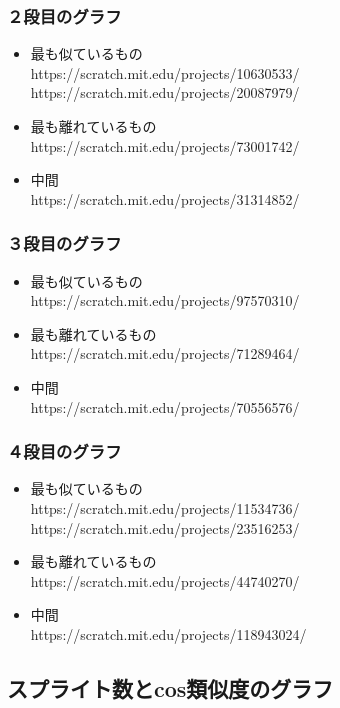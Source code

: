 \documentclass[a4paper,10pt,onecolumn,oneside,openany]{jsbook}
\begin{document}
\subsubsection{２段目のグラフ}
\begin{itemize}
\item 最も似ているもの
\\https://scratch.mit.edu/projects/10630533/
\\https://scratch.mit.edu/projects/20087979/
\item 最も離れているもの
\\https://scratch.mit.edu/projects/73001742/
\item 中間
\\https://scratch.mit.edu/projects/31314852/
\end{itemize}

 \subsubsection{３段目のグラフ}
 \begin{itemize}
\item 最も似ているもの
\\https://scratch.mit.edu/projects/97570310/
\item 最も離れているもの
\\https://scratch.mit.edu/projects/71289464/
\item 中間
\\https://scratch.mit.edu/projects/70556576/
\end{itemize}

\subsubsection{４段目のグラフ}
\begin{itemize}
\item 最も似ているもの
\\https://scratch.mit.edu/projects/11534736/
\\https://scratch.mit.edu/projects/23516253/
\item 最も離れているもの
\\https://scratch.mit.edu/projects/44740270/
\item 中間
\\https://scratch.mit.edu/projects/118943024/
\end{itemize}

\subsection{スプライト数とcos類似度のグラフ}
\end{document}
